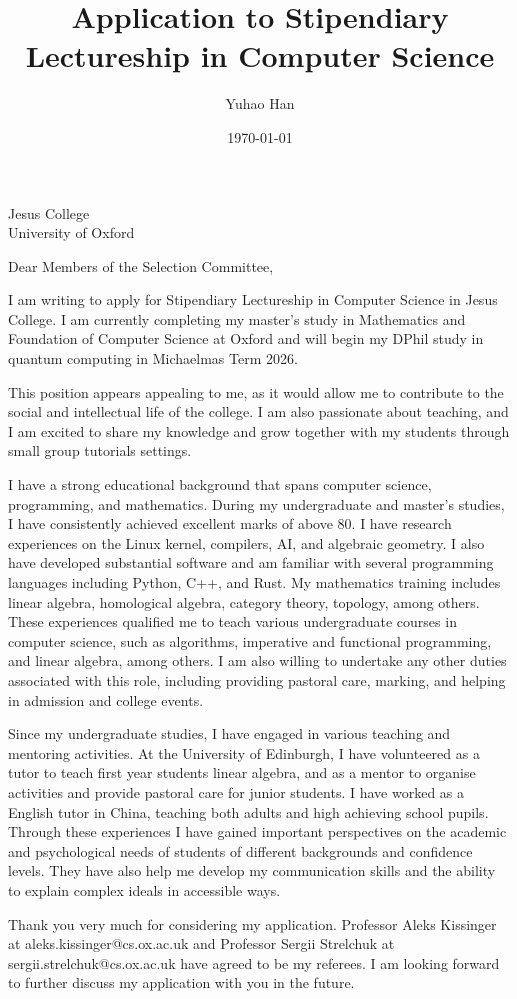 \documentclass{letter}
\title{Application to Stipendiary Lectureship in Computer Science}
\author{Yuhao Han}
\date{\today}
\begin{document}

\begin{letter}{Jesus College \\ University of Oxford}
\opening{Dear Members of the Selection Committee,}
I am writing to apply for Stipendiary Lectureship in Computer Science in Jesus College.
I am currently completing my master's study in Mathematics and Foundation of Computer Science at Oxford and will begin my DPhil study in quantum computing in Michaelmas Term 2026.

This position appears appealing to me, as it would allow me to contribute to the social and intellectual life of the college. 
I am also passionate about teaching, and I am excited to share my knowledge and grow together with my students through small group tutorials settings.

I have a strong educational background that spans computer science, programming, and mathematics.
During my undergraduate and master's studies, I have consistently achieved excellent marks of above 80.
I have research experiences on the Linux kernel, compilers, AI, and algebraic geometry. 
I also have developed substantial software and am familiar with several programming languages including Python, C++, and Rust.
My mathematics training includes linear algebra, homological algebra, category theory, topology, among others.
These experiences qualified me to teach various undergraduate courses in computer science, such as algorithms, imperative and functional programming, and linear algebra, among others. I am also willing to undertake any other duties associated with this role, including providing pastoral care, marking, and helping in admission and college events.

Since my undergraduate studies, I have engaged in various teaching and mentoring activities. 
At the University of Edinburgh, I have volunteered as a tutor to teach first year students linear algebra, and as a mentor to organise activities and provide pastoral care for junior students.
I have worked as a English tutor in China, teaching both adults and high achieving school pupils.
Through these experiences I have gained important perspectives on the academic and psychological needs of students of different backgrounds and confidence levels.
They have also help me develop my communication skills and the ability to explain complex ideals in accessible ways.

Thank you very much for considering my application.
Professor Aleks Kissinger at aleks.kissinger@cs.ox.ac.uk and Professor Sergii Strelchuk at sergii.strelchuk@cs.ox.ac.uk have agreed to be my referees.
I am looking forward to further discuss my application with you in the future.


\end{letter}
\end{document}
